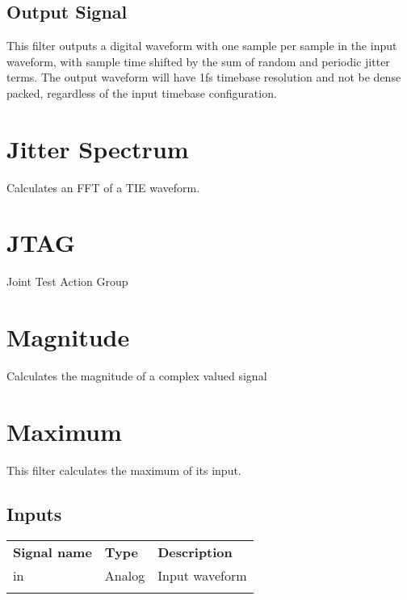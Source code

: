 \subsection{Output Signal}

This filter outputs a digital waveform with one sample per sample in the input waveform, with sample time shifted by
the sum of random and periodic jitter terms. The output waveform will have 1fs timebase resolution and not be dense
packed, regardless of the input timebase configuration.

\pagebreak
\section{Jitter Spectrum}

Calculates an FFT of a TIE waveform.

\pagebreak
\section{JTAG}

Joint Test Action Group

\pagebreak
\section{Magnitude}

Calculates the magnitude of a complex valued signal

\pagebreak
\section{Maximum}
\label{filter:maximum}

This filter calculates the maximum of its input.

\subsection{Inputs}
\begin{tabularx}{16cm}{llX}
\thickhline
\textbf{Signal name} & \textbf{Type} & \textbf{Description} \\
\thickhline
in & Analog & Input waveform \\
\thickhline
\end{tabularx}

